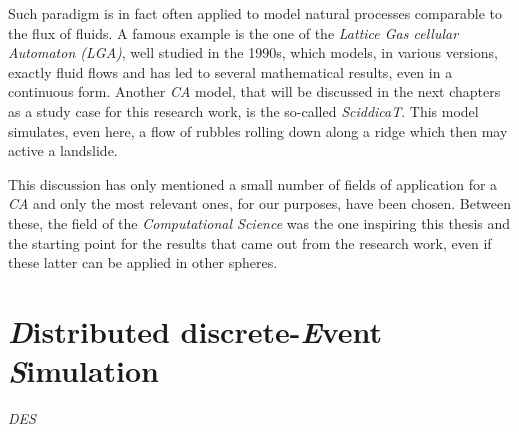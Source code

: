 \documentclass[12pt,a4paper,fleqn]{report}
\begin{document}
\begin{itemize}
Such paradigm is in fact often applied to model natural processes comparable to the flux of fluids. A famous example is the one of the \textit{Lattice Gas cellular Automaton (LGA)}, well studied in the 1990s, which models, in various versions, exactly fluid flows and has led to several mathematical results, even in a continuous form. Another \textit{CA} model, that will be discussed in the next chapters as a study case for this research work, is the so-called \textit{SciddicaT}. This model simulates, even here, a flow of rubbles rolling down along a ridge which then may active a landslide.
\end{itemize}

This discussion has only mentioned a small number of fields of application for a \textit{CA} and only the most relevant ones, for our purposes, have been chosen. Between these, the field of the \textit{Computational Science} was the one inspiring this thesis and the starting point for the results that came out from the research work, even if these latter can be applied in other spheres.

\newpage
\chapter{\textit{D}istributed discrete-\textit{E}vent \textit{S}imulation }{\Large{\textit{DES}}}\\
\end{document}
